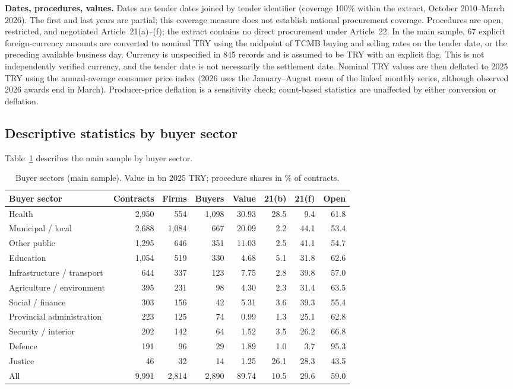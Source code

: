 \documentclass[11pt,a4paper]{article}
\newcommand{\botrule}{\bottomrule}
\begin{document}
\textbf{Dates, procedures, values.} Dates are tender dates joined by tender identifier (coverage 100\% within the extract, October 2010--March 2026). The first and last years are partial; this coverage measure does not establish national procurement coverage. Procedures are open, restricted, and negotiated Article~21(a)--(f); the extract contains no direct procurement under Article~22. In the main sample, 67 explicit foreign-currency amounts are converted to nominal TRY using the midpoint of TCMB buying and selling rates on the tender date, or the preceding available business day. Currency is unspecified in 845 records and is assumed to be TRY with an explicit flag. This is not independently verified currency, and the tender date is not necessarily the settlement date. Nominal TRY values are then deflated to 2025 TRY using the annual-average consumer price index (2026 uses the January--August mean of the linked monthly series, although observed 2026 awards end in March). Producer-price deflation is a sensitivity check; count-based statistics are unaffected by either conversion or deflation.

\subsection{Descriptive statistics by buyer sector}
Table~\ref{tab:sectors} describes the main sample by buyer sector.
\begin{table}[h]\centering\small
\caption{Buyer sectors (main sample). Value in bn 2025 TRY; procedure shares in \% of contracts.}\label{tab:sectors}
\begin{tabular}{@{}lrrrrrrr@{}}
\toprule
Buyer sector & Contracts & Firms & Buyers & Value & 21(b) & 21(f) & Open\\
\midrule
Health & 2,950 & 554 & 1,098 & 30.93 & 28.5 & 9.4 & 61.8\\
Municipal / local & 2,688 & 1,084 & 667 & 20.09 & 2.2 & 44.1 & 53.4\\
Other public & 1,295 & 646 & 351 & 11.03 & 2.5 & 41.1 & 54.7\\
Education & 1,054 & 519 & 330 & 4.68 & 5.1 & 31.8 & 62.6\\
Infrastructure / transport & 644 & 337 & 123 & 7.75 & 2.8 & 39.8 & 57.0\\
Agriculture / environment & 395 & 231 & 98 & 4.30 & 2.3 & 31.4 & 63.5\\
Social / finance & 303 & 156 & 42 & 5.31 & 3.6 & 39.3 & 55.4\\
Provincial administration & 223 & 125 & 74 & 0.99 & 1.3 & 25.1 & 62.8\\
Security / interior & 202 & 142 & 64 & 1.52 & 3.5 & 26.2 & 66.8\\
Defence & 191 & 96 & 29 & 1.89 & 1.0 & 3.7 & 95.3\\
Justice & 46 & 32 & 14 & 1.25 & 26.1 & 28.3 & 43.5\\
\midrule
All & 9,991 & 2,814 & 2,890 & 89.74 & 10.5 & 29.6 & 59.0\\
\botrule
\end{tabular}
\end{table}
\end{document}
